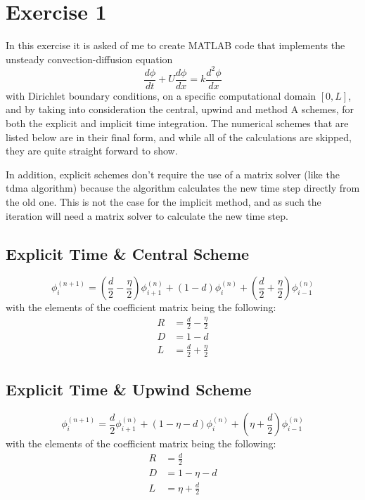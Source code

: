 
\section{Exercise 1}
\label{sec: exercise1}

In this exercise it is asked of me to create MATLAB code that implements the unsteady convection-diffusion equation 
\[
	\frac{ d \phi}{dt} + U \frac{d \phi}{dx} = k \frac{d^2 \phi}{dx}
\]
with Dirichlet boundary conditions, on a specific computational domain \( [0,L] \), and by taking into consideration the central, upwind and method A schemes, for both the explicit and implicit time integration. The numerical schemes that are listed below are in their final form, and while all of the calculations are skipped, they are quite straight forward to show.

In addition, explicit schemes don't require the use of a matrix solver (like the tdma algorithm) because the algorithm calculates the new time step directly from the old one. This is not the case for the implicit method, and as such the iteration will need a matrix solver to calculate the new time step.

\subsection{Explicit Time \& Central Scheme}
\[
	\phi_{i}^{(n+1)} = \left( \frac{d}{2} - \frac{\eta}{2} \right) \phi_{i+1}^{(n)} + \left( 1 - d \right) \phi_{i}^{(n)} + \left( \frac{d}{2} + \frac{\eta}{2} \right) \phi_{i-1}^{(n)}
\]
with the elements of the coefficient matrix being the following:
\begin{align*}
	R &= \frac{d}{2} - \frac{\eta}{2} \\
	D &= 1-d \\
	L &= \frac{d}{2} + \frac{\eta}{2} 
\end{align*}

\subsection{Explicit Time \& Upwind Scheme}
\[
	\phi_{i}^{(n+1)} = \frac{d}{2} \phi_{i+1}^{(n)} + \left( 1 - \eta - d \right) \phi_{i}^{(n)} + \left( \eta + \frac{d}{2} \right) \phi_{i-1}^{(n)}
\]
with the elements of the coefficient matrix being the following:
\begin{align*}
	R &= \frac{d}{2} \\
	D &= 1-\eta-d \\
	L &= \eta + \frac{d}{2} 
\end{align*}

